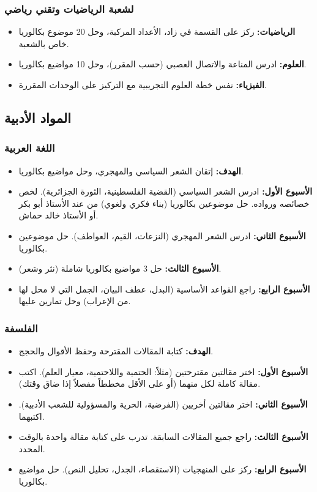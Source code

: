 \documentclass[12pt,a4paper]{book}
\begin{document}
	\subsubsection*{لشعبة الرياضيات وتقني رياضي}
	\begin{itemize}
		\item \textbf{الرياضيات:} ركز على القسمة في زاد، الأعداد المركبة، وحل 20 موضوع بكالوريا خاص بالشعبة.
		\item \textbf{العلوم:} ادرس المناعة والاتصال العصبي (حسب المقرر)، وحل 10 مواضيع بكالوريا.
		\item \textbf{الفيزياء:} نفس خطة العلوم التجريبية مع التركيز على الوحدات المقررة.
	\end{itemize}
	
	\subsection{المواد الأدبية}
	
	\subsubsection*{اللغة العربية}
	\begin{itemize}
		\item \textbf{الهدف:} إتقان الشعر السياسي والمهجري، وحل مواضيع بكالوريا.
		\item \textbf{الأسبوع الأول:} ادرس الشعر السياسي (القضية الفلسطينية، الثورة الجزائرية). لخص خصائصه ورواده. حل موضوعين بكالوريا (بناء فكري ولغوي) من عند الأستاذ أبو بكر أو الأستاذ خالد حماش.
		\item \textbf{الأسبوع الثاني:} ادرس الشعر المهجري (النزعات، القيم، العواطف). حل موضوعين بكالوريا.
		\item \textbf{الأسبوع الثالث:} حل 3 مواضيع بكالوريا شاملة (نثر وشعر).
		\item \textbf{الأسبوع الرابع:} راجع القواعد الأساسية (البدل، عطف البيان، الجمل التي لا محل لها من الإعراب) وحل تمارين عليها.
	\end{itemize}
	
	\subsubsection*{الفلسفة}
	\begin{itemize}
		\item \textbf{الهدف:} كتابة المقالات المقترحة وحفظ الأقوال والحجج.
		\item \textbf{الأسبوع الأول:} اختر مقالتين مقترحتين (مثلاً: الحتمية واللاحتمية، معيار العلم). اكتب مقالة كاملة لكل منهما (أو على الأقل مخططاً مفصلاً إذا ضاق وقتك).
		\item \textbf{الأسبوع الثاني:} اختر مقالتين أخريين (الفرضية، الحرية والمسؤولية للشعب الأدبية). اكتبهما.
		\item \textbf{الأسبوع الثالث:} راجع جميع المقالات السابقة. تدرب على كتابة مقالة واحدة بالوقت المحدد.
		\item \textbf{الأسبوع الرابع:} ركز على المنهجيات (الاستقصاء، الجدل، تحليل النص). حل مواضيع بكالوريا.
	\end{itemize}
	
\end{document}

